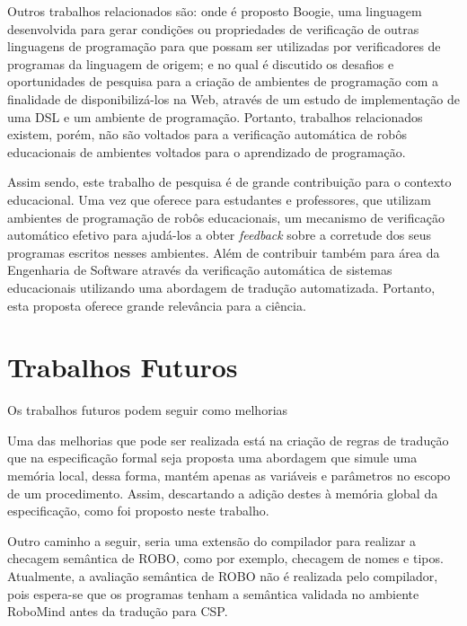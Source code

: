 Outros trabalhos relacionados são: \cite{this-is-boogie-2-2} onde é proposto Boogie, uma linguagem desenvolvida para gerar condições ou propriedades de verificação de outras linguagens de programação para que possam ser utilizadas por verificadores de programas da linguagem de origem; e \cite{Kats} no qual é discutido os desafios e oportunidades de pesquisa para a criação de ambientes de programação com a finalidade de disponibilizá-los na Web, através de um estudo de implementação de uma DSL e um ambiente de programação. Portanto, trabalhos relacionados existem, porém, não são voltados para a verificação automática de robôs educacionais de ambientes voltados para o aprendizado de programação.

Assim sendo, este trabalho de pesquisa é de grande contribuição para o contexto educacional. Uma vez que oferece para estudantes e professores, que utilizam ambientes de programação de robôs educacionais, um mecanismo de verificação automático efetivo para ajudá-los a obter \textit{feedback} sobre a corretude dos seus programas escritos nesses ambientes. Além de contribuir também para área da Engenharia de Software através da verificação automática de sistemas educacionais utilizando uma abordagem de tradução automatizada. Portanto, esta proposta oferece grande relevância para a ciência.


\section{Trabalhos Futuros}

Os trabalhos futuros podem seguir como melhorias 

Uma das melhorias que pode ser realizada está na criação de regras de tradução que na especificação formal seja proposta uma abordagem que simule uma memória local, dessa forma, mantém apenas as variáveis e parâmetros no escopo de um procedimento. Assim, descartando a adição destes à memória global da especificação, como foi proposto neste trabalho.

Outro caminho a seguir, seria uma extensão do compilador para realizar a checagem semântica de ROBO, como por exemplo, checagem de nomes e tipos. Atualmente, a avaliação semântica de ROBO não é realizada pelo compilador, pois espera-se que os programas tenham a semântica validada no ambiente RoboMind antes da tradução para CSP.